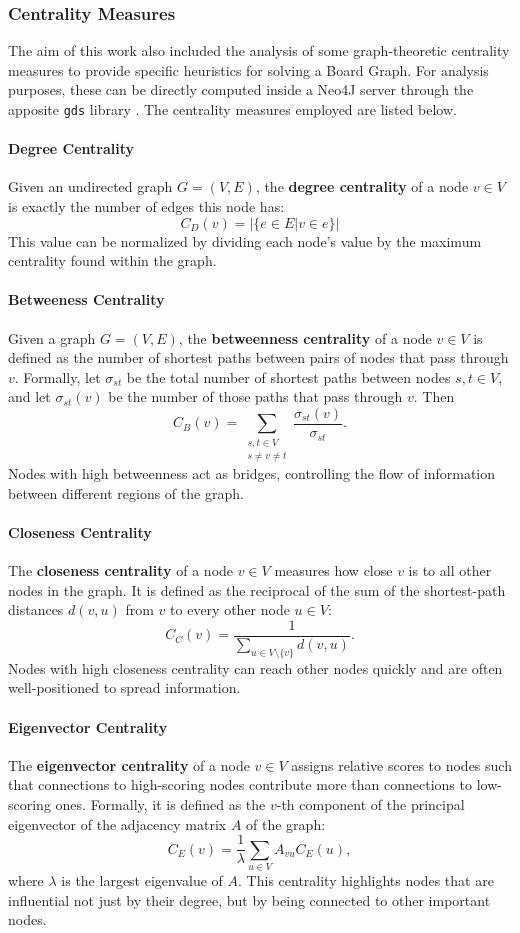 \documentclass[conference]{IEEEtran}
\begin{document}
\subsubsection{Centrality Measures}
The aim of this work also included the analysis of some graph-theoretic centrality measures to provide specific heuristics for solving a Board Graph. For analysis purposes, these can be directly computed inside a Neo4J server through the apposite \texttt{gds} library \cite{gds}. The centrality measures employed are listed below.

\paragraph{Degree Centrality} Given an undirected graph $G = (V, E)$, the \textbf{degree centrality} of a node $v \in V$ is exactly the number of edges this node has:
$$
	C_D(v) = |\{e \in E | v \in e\}|
$$
This value can be normalized by dividing each node's value by the maximum centrality found within the graph.

\paragraph{Betweeness Centrality}
Given a graph $G = (V, E)$, the \textbf{betweenness centrality} of a node $v \in V$ is defined as the number of shortest paths between pairs of nodes that pass through $v$. 
Formally, let $\sigma_{st}$ be the total number of shortest paths between nodes $s, t \in V$, and let $\sigma_{st}(v)$ be the number of those paths that pass through $v$. 
Then
$$
C_B(v) = \sum_{\substack{s, t \in V \\ s \neq v \neq t}} \frac{\sigma_{st}(v)}{\sigma_{st}}.
$$
Nodes with high betweenness act as bridges, controlling the flow of information between different regions of the graph.

\paragraph{Closeness Centrality} 
The \textbf{closeness centrality} of a node $v \in V$ measures how close $v$ is to all other nodes in the graph. 
It is defined as the reciprocal of the sum of the shortest-path distances $d(v,u)$ from $v$ to every other node $u \in V$: 
$$
C_C(v) = \frac{1}{\sum_{u \in V \setminus \{v\}} d(v, u)}.
$$
Nodes with high closeness centrality can reach other nodes quickly and are often well-positioned to spread information.

\paragraph{Eigenvector Centrality} 
The \textbf{eigenvector centrality} of a node $v \in V$ assigns relative scores to nodes such that connections to high-scoring nodes contribute more than connections to low-scoring ones. 
Formally, it is defined as the $v$-th component of the principal eigenvector of the adjacency matrix $A$ of the graph:
$$
C_E(v) = \frac{1}{\lambda} \sum_{u \in V} A_{vu} C_E(u),
$$
where $\lambda$ is the largest eigenvalue of $A$. 
This centrality highlights nodes that are influential not just by their degree, but by being connected to other important nodes.
\end{document}
